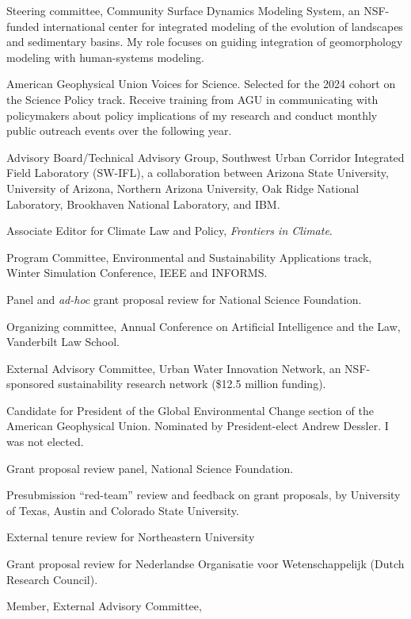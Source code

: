 \item[2024--2027] Steering committee, Community Surface Dynamics Modeling System, an NSF-funded international center for integrated modeling of
the evolution of landscapes and sedimentary basins. My role focuses on guiding
integration of geomorphology modeling with human-systems modeling.
\item[2024--2025] American Geophysical Union Voices for Science. Selected for
  the 2024 cohort on the Science Policy track. Receive training from AGU in
  communicating with policymakers about policy implications of my research and
  conduct monthly public outreach events over the following year.
\item[2023--2025] Advisory Board/Technical Advisory Group,
  Southwest Urban Corridor Integrated Field Laboratory (SW-IFL),
  a collaboration between Arizona State University, University of Arizona,
  Northern Arizona University, Oak Ridge National Laboratory,
  Brookhaven National Laboratory, and IBM.
\item[2021--present] Associate Editor for Climate Law and Policy,
   \emph{Frontiers in Climate}.
\item[2016--2023] Program Committee,
  Environmental and Sustainability Applications track,
  Winter Simulation Conference, IEEE and INFORMS.
\item[2023] Panel and \emph{ad-hoc\/} grant proposal review for National Science Foundation.
\item[2016--2022] Organizing committee,
  Annual Conference on Artificial Intelligence and the Law,
  Vanderbilt Law School.
\item[2016--2021] External Advisory Committee,
  Urban Water Innovation Network, an NSF-sponsored sustainability
  research network (\$12.5 million funding).
\item[2022] Candidate for President of the Global Environmental Change
  section of the American Geophysical Union. Nominated by President-elect
  Andrew Dessler. I was not elected.
\item[2022] Grant proposal review panel, National Science Foundation.
\item[2022] Presubmission ``red-team'' review and feedback on grant proposals,
  by University of Texas, Austin and Colorado State University.
\item[2021] External tenure review for Northeastern University
\item[2021] Grant proposal review for Nederlandse Organisatie voor Wetenschappelijk
  (Dutch Research Council).
\item[2019--2021] Member, External Advisory Committee,

